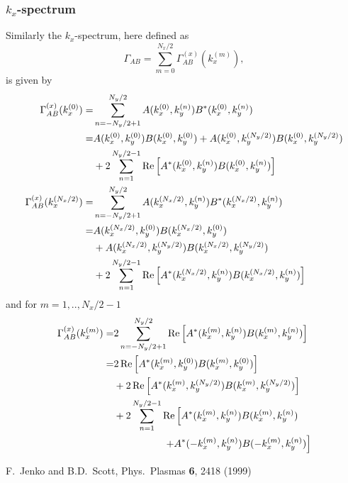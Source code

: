 \documentclass[12pt, a4paper, fleqn]{article}
\begin{document}
\subsubsection{$k_x$-spectrum}
Similarly the $k_x$-spectrum, here defined as
\begin{equation}
\Gamma_{AB} = \sum_{m=0}^{N_x/2} \Gamma^{(x)}_{AB}(k^{(m)}_x),
\end{equation}
is given by
\begin{align}
\Gamma^{(x)}_{AB}(k^{(0)}_x)= & \sum_{n=-N_y/2+1}^{N_y/2} A(k^{(0)}_x, k^{(n)}_y) B^*(k^{(0)}_{x}, k^{(n)}_{y}) \nonumber \\
= & A(k^{(0)}_x,k^{(0)}_y)B(k^{(0)}_x,k^{(0)}_y) + A(k^{(0)}_x, k^{(N_y/2)}_y)B(k^{(0)}_x, k^{(N_y/2)}_y)\nonumber \\
 & + 2 \sum_{n = 1}^{N_y/2-1} {\rm Re}\left[A^*(k^{(0)}_x, k^{(n)}_y) B(k^{(0)}_x, k^{(n)}_y)\right]\\
\Gamma^{(x)}_{AB}(k^{(N_x/2)}_x) = & \sum_{n=-N_y/2+1}^{N_y/2} A(k^{(N_x/2)}_x, k^{(n)}_y) B^*(k^{(N_x/2)}_{x}, k^{(n)}_{y}) \nonumber \\
= & A(k^{(N_x/2)}_x, k^{(0)}_y) B(k^{(N_x/2)}_x, k^{(0)}_y) \nonumber \\
& + A(k^{(N_x/2)}_x, k^{(N_y/2)}_y)B(k^{(N_x/2)}_x, k^{(N_y/2)}_y) \nonumber \\
& + 2 \sum_{n = 1}^{N_y/2-1} {\rm Re}\left[A^*(k^{(N_x/2)}_x, k^{(n)}_y) B(k^{(N_x/2)}_x,k^{(n)}_y)\right]
\end{align}
and for $m=1,..,N_x/2-1$
\begin{align}
\Gamma^{(x)}_{AB}(k^{(m)}_x) = & 2 \sum_{n=-N_y/2+1}^{N_y/2} {\rm Re}\left[A^*(k^{(m)}_x, k^{(n)}_y) B(k^{(m)}_x, k^{(n)}_y)\right] \nonumber \\
= & 
2 \,{\rm Re}\left[A^*(k^{(m)}_x, k^{(0)}_y) B(k^{(m)}_x, k^{(0)}_y)\right] \nonumber \\
& + 2\, {\rm Re}\left[A^*(k^{(m)}_x, k^{(N_y/2)}_y)B(k^{(m)}_x, k^{(N_y/2)}_y)\right]\nonumber \\
& + 2 \sum_{n = 1}^{N_y/2-1} {\rm Re} \left[ A^*(k^{(m)}_x, k^{(n)}_y) B(k^{(m)}_x,k^{(n)}_y)
 \right. \nonumber \\
& \left. \hspace{5em} + A^*(-k^{(m)}_x,k^{(n)}_y)B(-k^{(m)}_x,k^{(n)}_y) \right]
\end{align}


\begin{thebibliography}{99}
 F.~Jenko and B.D.~Scott, Phys.~Plasmas \textbf{6}, 2418 (1999)
\end{thebibliography}
\end{document}
